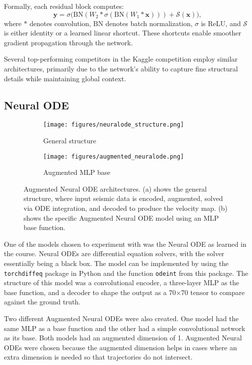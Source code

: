 \documentclass{article}
\begin{document}
Formally, each residual block computes:
\[
\mathbf{y} = \sigma\bigl(\mathrm{BN}(W_2 * \sigma(\mathrm{BN}(W_1 * \mathbf{x}))) + \mathcal{S}(\mathbf{x})\bigr),
\]
where \( * \) denotes convolution, \(\mathrm{BN}\) denotes batch normalization, \(\sigma\) is ReLU, and \(\mathcal{S}\) is either identity or a learned linear shortcut. These shortcuts enable smoother gradient propagation through the network.

Several top-performing competitors in the Kaggle competition employ similar architectures, primarily due to the network's ability to capture fine structural details while maintaining global context.

\subsection{Neural ODE}
\begin{figure}
    \centering
    \begin{subfigure}[b]{0.47\linewidth}
        \centering
        \texttt{[image: figures/neuralode\_structure.png]}
        \caption{General structure}
    \end{subfigure}
    \hfill
    \begin{subfigure}[b]{0.47\linewidth}
        \centering
        \texttt{[image: figures/augmented\_neuralode.png]}
        \caption{Augmented MLP base}
    \end{subfigure}
    \caption{Augmented Neural ODE architectures. (a) shows the general structure, where input seismic data is encoded, augmented, solved via ODE integration, and decoded to produce the velocity map. (b) shows the specific Augmented Neural ODE model using an MLP base function.}
    \label{fig:neuralode-merged}
\end{figure}

One of the models chosen to experiment with was the Neural ODE as learned in the course. Neural ODEs are differential equation solvers, with the solver essentially being a black box. The model can be implemented by using the \texttt{torchdiffeq} package in Python and the function \texttt{odeint} from this package. The structure of this model was a convolutional encoder, a three-layer MLP as the base function, and a decoder to shape the output as a 70×70 tensor to compare against the ground truth. 

Two different Augmented Neural ODEs were also created. One model had the same MLP as a base function and the other had a simple convolutional network as its base. Both models had an augmented dimension of 1. Augmented Neural ODEs were chosen because the augmented dimension helps in cases where an extra dimension is needed so that trajectories do not intersect.
\end{document}
